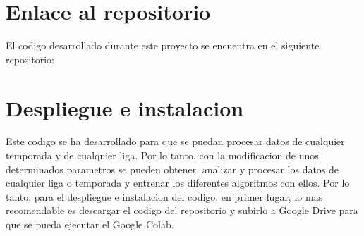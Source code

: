 



\section{Enlace al repositorio}
El codigo desarrollado durante este proyecto se encuentra en el siguiente repositorio:

\section{Despliegue e instalacion}
Este codigo se ha desarrollado para que se puedan procesar datos de cualquier temporada y de cualquier liga. Por lo tanto, con la modificacion de unos determinados parametros se pueden obtener, analizar y procesar los datos de cualquier liga o temporada y entrenar los diferentes algoritmos con ellos. 
Por lo tanto, para el despliegue e instalacion del codigo, en primer lugar, lo mas recomendable es descargar el codigo del repositorio y subirlo a Google Drive para que se pueda ejecutar el Google Colab. 


